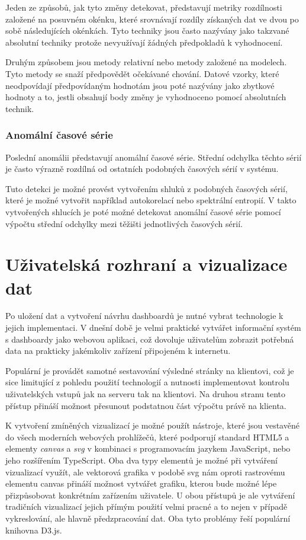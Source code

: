 Jeden ze způsobů, jak tyto změny detekovat, představují metriky rozdílnosti založené na posuvném okénku, které srovnávají rozdíly získaných dat ve dvou po sobě následujících okénkách. Tyto techniky jsou často nazývány jako takzvané absolutní techniky protože nevyužívají žádných předpokladů k vyhodnocení.

Druhým způsobem jsou metody relativní nebo metody založené na modelech. Tyto metody se snaží předpovědět očekávané chování.  Datové vzorky, které neodpovídají předpovídaným hodnotám jsou poté nazývány jako zbytkové hodnoty a to, jestli obsahují body změny je vyhodnoceno pomocí absolutních technik.
\subsection*{Anomální časové série}
Poslední anomálii představují anomální časové série. Střední odchylka těchto sérií je často výrazně rozdílná od ostatních podobných časových sérií v systému. 

Tuto detekci je možné provést vytvořením shluků z podobných časových sérií, které je možné vytvořit například autokorelací nebo spektrální entropií. V takto vytvořených shlucích je poté možné detekovat anomální časové série pomocí výpočtu střední odchylky mezi těžišti jednotlivých časových sérií.

\chapter{Uživatelská rozhraní a vizualizace dat}
\label{chapter_visualisation}
Po uložení dat a vytvoření návrhu dashboardů je nutné vybrat technologie k jejich implementaci. V dnešní době je velmi praktické vytvářet informační systém s dashboardy jako webovou aplikaci, což dovoluje uživatelům zobrazit potřebná data na prakticky jakémkoliv zařízení připojeném k internetu. 

Populární je provádět samotné sestavování výsledné stránky na klientovi, což je sice limitující z pohledu použití technologií a nutnosti implementovat kontrolu uživatelských vstupů jak na serveru tak na klientovi. Na druhou stranu tento přístup přináší možnost přesunout podstatnou část výpočtu právě na klienta.

K vytvoření zmíněných vizualizací je možné použít nástroje, které jsou vestavěné do všech moderních webových prohlížečů, které podporují standard HTML5 a elementy \textit{canvas} a \textit{svg} v kombinaci s programovacím jazykem JavaScript, nebo jeho rozšířením TypeScript. Oba dva typy elementů je možné při vytváření vizualizací využít, ale vektorová grafika v podobě svg nám oproti rastrovému elementu canvas přináší možnost vytvářet grafiku, kterou bude možné lépe přizpůsobovat konkrétním zařízením uživatele. U obou přístupů je ale vytváření tradičních vizualizací jejich přímým použití velmi pracné a to nejen v případě vykreslování, ale hlavně předzpracování dat. Oba tyto problémy řeší populární knihovna D3.js.

